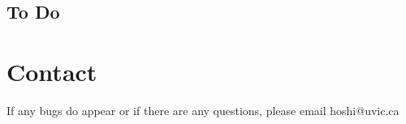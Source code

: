 \subsection{To Do}



\section{Contact}
If any bugs do appear or if there are any questions, please email hoshi@uvic.ca



%
%
%
%
